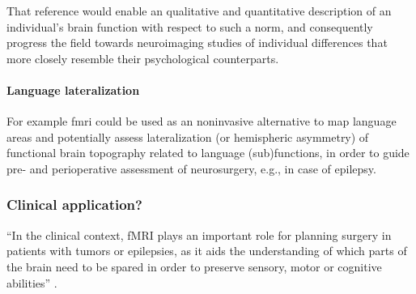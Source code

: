 

%
That reference would enable an qualitative and quantitative description of an
individual's brain function with respect to such a norm, and consequently
progress the field towards neuroimaging studies of individual differences that
more closely resemble their psychological counterparts.


\paragraph{Language lateralization}


%
For example \ac{fmri} could be used as an noninvasive alternative to map
language areas and potentially assess lateralization (or hemispheric asymmetry)
of functional brain topography related to language (sub)functions, in order to
guide pre- and perioperative assessment of neurosurgery, e.g., in case of
epilepsy.



\subsubsection{Clinical application?}




``In the clinical context, fMRI plays an important role for planning surgery in
patients with tumors or epilepsies, as it aids the understanding of which parts
of the brain need to be spared in order to preserve sensory, motor or cognitive
abilities'' \citep{wegrzyn2018thought}.


